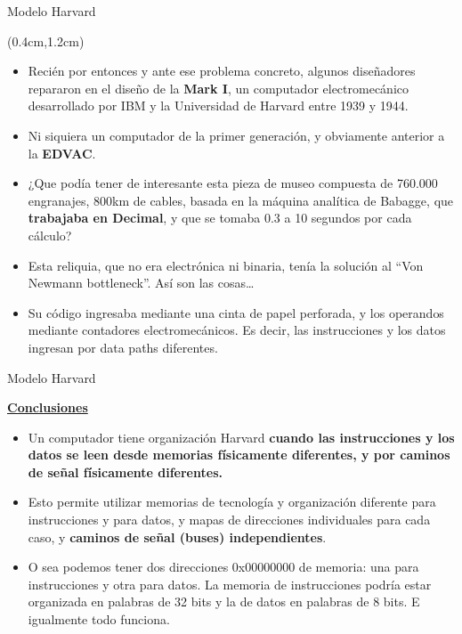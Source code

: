 \documentclass[table,dvipsnames,aspectratio=169]{beamer}
\begin{document}
\begin{frame}{Modelo Harvard}
 \begin{textblock*}{\textwidth}(0.4cm,1.2cm)
  \begin{itemize}[<+->]\justifying\parskip 0.2cm
   \item Recién por entonces y ante ese problema concreto, algunos diseñadores repararon en el diseño de la \textbf{Mark I}, un computador electromecánico desarrollado por IBM y la Universidad de Harvard entre 1939 y 1944. 
   \item \textcolor{furfiBlue}{Ni siquiera un computador de la primer generación, y obviamente anterior a la \textbf{EDVAC}.}
   \item ¿Que podía tener de interesante esta pieza de museo compuesta de 760.000 engranajes, 800km de cables, basada en la máquina analítica de Babagge, que \textbf{trabajaba en Decimal}, y que se tomaba 0.3 a 10 segundos por cada cálculo? %
   \item Esta reliquia, que no era electrónica ni binaria, tenía la solución al ``Von Newmann bottleneck''. Así son las cosas\dots
   \item Su código ingresaba mediante una cinta de papel perforada, y los operandos mediante contadores electromecánicos. \textcolor{furfiBlue}{Es decir, las instrucciones y los datos ingresan por data paths diferentes.}
  \end{itemize}
 \end{textblock*}
\end{frame}

\begin{frame}{Modelo  Harvard }
\begin{block}{\textbf{\underline{Conclusiones}}}
\begin{itemize}[<+(1)->]\justifying
 \item Un computador tiene organización Harvard \textbf{\color{red}cuando las instrucciones y los datos se leen desde memorias físicamente diferentes, y por caminos de señal físicamente diferentes.}
 \item Esto permite utilizar memorias de tecnología y organización diferente para instrucciones y para datos, y mapas de direcciones individuales para cada caso, y \textbf{\color{red} caminos de señal (buses) independientes}.
 \item O sea podemos tener dos direcciones 0x00000000 de memoria: una para instrucciones y otra para datos. La memoria de instrucciones podría estar organizada en palabras de 32 bits y la de datos en palabras de 8 bits. 
 \textcolor{furfiGreen}{E igualmente todo funciona.}
\end{itemize}
\end{block}
\end{frame}
\end{document}
